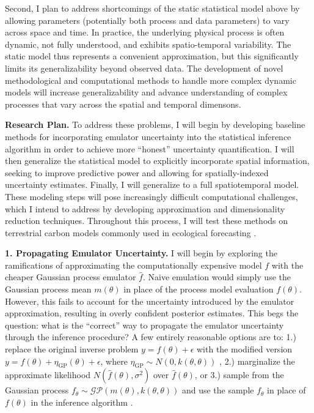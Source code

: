 \documentclass[12pt]{article}
\begin{document}
 Second, I plan to address shortcomings of the static statistical model above by allowing parameters (potentially both process and data parameters) to vary across space 
 and time. In practice, the underlying physical process is often dynamic, not fully understood, and exhibits spatio-temporal variability. The static model thus 
 represents a convenient approximation, but this significantly limits its generalizability beyond observed data. The development of novel methodological and computational 
 methods to handle more complex dynamic models will increase generalizability and advance understanding of complex processes that vary across the spatial and 
 temporal dimensons. 

\noindent
\textbf{Research Plan.} To address these problems, I will begin by developing baseline methods for incorporating emulator uncertainty into the statistical inference algorithm in order to achieve more ``honest'' uncertainty quantification. I will then generalize the statistical model to explicitly incorporate spatial information, seeking to improve predictive power and allowing for spatially-indexed uncertainty estimates. Finally, I will generalize to a full spatiotemporal model. These modeling steps will pose increasingly difficult computational challenges, which I intend to address by developing approximation and dimensionality reduction techniques. Throughout this process, I will test these methods on terrestrial carbon models commonly used in ecological forecasting \cite{Dietze}. 
 
 \textbf{1. Propagating Emulator Uncertainty.} I will begin by exploring the ramifications of approximating the computationally expensive model $f$ with the  cheaper Gaussian process emulator $\hat{f}$. Naive emulation would simply use the Gaussian process mean $m(\theta)$ in place of the process model evaluation $f(\theta)$. However, this fails to account
 for the uncertainty introduced by the emulator approximation, resulting in overly confident posterior estimates. This begs the question: what is the ``correct'' way to propagate the emulator uncertainty through 
 the inference procedure? A few entirely reasonable options are to: 1.) replace the original inverse problem $y = f(\theta) + \epsilon$ with the modified version $y = f(\theta) + \eta_{\text{GP}}(\theta) + \epsilon$, 
 where $\eta_{\text{GP}} \sim N(0, k(\theta, \theta))$ \cite{Cleary}, 2.) marginalize the approximate likelihood $N(\hat{f}(\theta), \sigma^2)$ over $\hat{f}(\theta)$, or 3.) sample from the Gaussian process 
 $f_\theta \sim \mathcal{GP}(m(\theta), k(\theta, \theta))$ and use the sample $f_\theta$ in place of $f(\theta)$ in the inference algorithm \cite{Fer}. 
 
\end{document}

